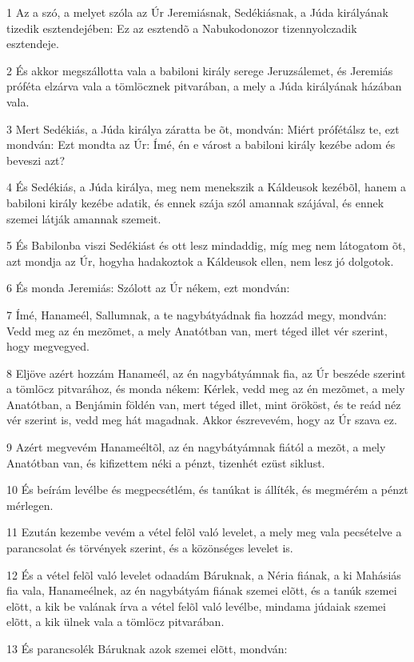 \par 1 Az a szó, a melyet szóla az Úr Jeremiásnak, Sedékiásnak, a Júda királyának tizedik esztendejében: Ez az esztendõ a Nabukodonozor tizennyolczadik esztendeje.
\par 2 És akkor megszállotta vala a babiloni király serege Jeruzsálemet, és Jeremiás próféta elzárva vala a tömlöcznek pitvarában, a mely a Júda királyának házában vala.
\par 3 Mert Sedékiás, a Júda királya záratta be õt, mondván: Miért prófétálsz te, ezt mondván: Ezt mondta az Úr: Ímé, én e várost a babiloni király kezébe adom és beveszi azt?
\par 4 És Sedékiás, a Júda királya, meg nem menekszik a Káldeusok kezébõl, hanem a babiloni király kezébe adatik, és ennek szája szól amannak szájával, és ennek szemei látják amannak szemeit.
\par 5 És Babilonba viszi Sedékiást és ott lesz mindaddig, míg meg nem látogatom õt, azt mondja az Úr, hogyha hadakoztok a Káldeusok ellen, nem lesz jó dolgotok.
\par 6 És monda Jeremiás: Szólott az Úr nékem, ezt mondván:
\par 7 Ímé, Hanameél, Sallumnak, a te nagybátyádnak fia hozzád megy, mondván: Vedd meg az én mezõmet, a mely Anatótban van, mert téged illet vér szerint, hogy megvegyed.
\par 8 Eljöve azért hozzám Hanameél, az én nagybátyámnak fia, az Úr beszéde szerint a tömlöcz pitvarához, és monda nékem: Kérlek, vedd meg az én mezõmet, a mely Anatótban, a Benjámin földén van, mert téged illet, mint örököst, és te reád néz vér szerint is, vedd meg hát magadnak. Akkor észrevevém, hogy az Úr szava ez.
\par 9 Azért megvevém Hanameéltõl, az én nagybátyámnak fiától a mezõt, a mely Anatótban van, és kifizettem néki a pénzt, tizenhét ezüst siklust.
\par 10 És beírám levélbe és megpecsétlém, és tanúkat is állíték, és megmérém a pénzt mérlegen.
\par 11 Ezután kezembe vevém a vétel felõl való levelet, a mely meg vala pecsételve a parancsolat és törvények szerint, és a közönséges levelet is.
\par 12 És a vétel felõl való levelet odaadám Báruknak, a Néria fiának, a ki Mahásiás fia vala, Hanameélnek, az én nagybátyám fiának szemei elõtt, és a tanúk szemei elõtt, a kik be valának írva a vétel felõl való levélbe, mindama júdaiak szemei elõtt, a kik ülnek vala a tömlöcz pitvarában.
\par 13 És parancsolék Báruknak azok szemei elõtt, mondván:
